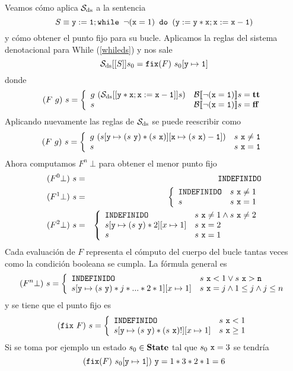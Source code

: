 \begin{example} Veamos cómo aplica $\mathcal{S}_{\mathrm{ds}}$ a la sentencia
\[
    S \equiv \texttt{y}:=\texttt{1}; \texttt{while } \neg(\texttt{x}=1) \texttt{ do } (\texttt{y}:=\texttt{y}*\texttt{x}; \texttt{x}:=\texttt{x}-\texttt{1})
\]
y cómo obtener el punto fijo para su bucle. Aplicamos la reglas del sistema denotacional para While (\ref{whileds}) y nos sale
\[
    \mathcal{S}_{\mathrm{ds}}[[S]] s_0 = \texttt{fix}(F)\ s_0[\texttt{y} \mapsto \texttt{1}]
\]
donde
\[
    (F\ g)\ s = \left\{\begin{array}{ll}
         g\ (\mathcal{S}_{\mathrm{ds}}[[\texttt{y}*\texttt{x}; \texttt{x}:=\texttt{x}-\texttt{1}]]s) & \mathcal{B}[\![\neg(\texttt{x} = \texttt{1})]\!]s = \textbf{tt} \\
         s & \mathcal{B}[\![\neg(\texttt{x} = \texttt{1})]\!]s = \textbf{ff} 
    \end{array}\right.
\]
Aplicando nuevamente las reglas de $\mathcal{S}_{\mathrm{ds}}$ se puede reescribir como
\[
    (F\ g)\ s = \left\{\begin{array}{ll}
         g\ (s[\n{y}\mapsto (s\ \n{y})*(s\ \n{x})][\n{x}\mapsto(s\ \n{x})-\n{1}]) & s\ \n{x} \neq \n{1} \\
         s & s\ \n{x} = \n{1}
    \end{array}\right.
\]
Ahora computamos $F^n\ \bot$ para obtener el menor punto fijo
\begin{eqnarray*}
    (F^0 \bot)\ s &=& \texttt{INDEFINIDO} \\
    (F^1 \bot)\ s &=& \left\{\begin{array}{ll}
         \texttt{INDEFINIDO} & s\ \texttt{x} \neq 1 \\
         s & s\ \texttt{x} = 1
    \end{array}\right. \\
    (F^2 \bot)\ s &=& \left\{\begin{array}{ll}
         \texttt{INDEFINIDO} & s\ \texttt{x} \neq 1 \land s\ \texttt{x} \neq 2 \\
         s[\texttt{y}\mapsto (s\ \texttt{y})*2][x\mapsto 1] & s\ \texttt{x} = 2 \\
         s & s\ \texttt{x} = 1
    \end{array}\right. \\
\end{eqnarray*}
Cada evaluación de $F$ representa el cómputo del cuerpo del bucle tantas veces como la condición booleana se cumpla. La fórmula general es
\[
    (F^n \bot)\ s = \left\{\begin{array}{ll}
         \texttt{INDEFINIDO} & s\ \texttt{x} < 1 \lor s\ \texttt{x} > \texttt{n} \\
         s[\texttt{y}\mapsto (s\ \texttt{y})*j*...*2*1][x\mapsto 1] & s\ \texttt{x} = j \land 1\leq j \land j\leq n \\
    \end{array}\right.
\]
y se tiene que el punto fijo es
\[
    (\n{fix}\ F)\ s = \left\{\begin{array}{ll}
         \n{INDEFINIDO} & s\ \n{x} < 1 \\
         s[\n{y}\mapsto (s\ \n{y})*(s\ \n{x})!][x\mapsto 1] & s\ \n{x}\geq 1 \\
    \end{array}\right.
\]
Si se toma por ejemplo un estado $s_0\in\textbf{State}$ tal que $s_0\ \texttt{x} = 3$ se tendría
\[
     (\texttt{fix}(F)\ s_0[\texttt{y} \mapsto \texttt{1}])\ \texttt{y} = 1*3*2*1 = 6
\]
\end{example}

